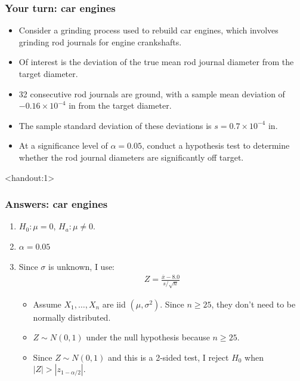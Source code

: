 \documentclass[handout]{beamer}\usepackage[]{graphicx}\usepackage[]{color}
\newcommand{\answers}{1}
\providecommand{\ov}[1]{\overline{#1}}
\numberwithin{equation}{section}
\begin{document}
\begin{frame}
\frametitle{Your turn: car engines}
\begin{itemize}
\item Consider a grinding process used to rebuild car engines, which involves grinding rod journals for engine crankshafts. 
\pause \item Of interest is the deviation of the true mean rod journal diameter from the target diameter.
\pause \item 32 consecutive rod journals are ground, with a sample mean deviation of $-0.16 \times 10^{-4}$ in from the target diameter.
\pause \item The sample standard deviation of these deviations is $s = 0.7 \times 10^{-4}$ in.
\pause \item At a significance level of $\alpha = 0.05$, conduct a hypothesis test to determine whether the rod journal diameters are significantly off target.
\end{itemize}
\end{frame}



\begin{frame}<handout:\answers>
\frametitle{Answers: car engines}
\begin{enumerate}[1. ]
\item  $H_0: \mu = 0$, $H_a: \mu \ne 0$. 
\pause \item $\alpha = 0.05$
\pause \item Since $\sigma$ is unknown, I use:
\begin{align*}
Z = \frac{\ov{x} - 8.0}{s/\sqrt{n}}
\end{align*}
\begin{itemize}
\pause \item Assume $X_1, \ldots, X_n$ are iid $(\mu, \sigma^2)$. Since $n \ge 25$, they don't need to be normally distributed.
\pause \item $Z \sim N(0,1)$ under the null hypothesis because $n \ge 25$.
\pause \item Since $Z \sim N(0,1)$ and this is a 2-sided test, I reject $H_0$ when $|Z| > |z_{1-\alpha/2}|$.
\end{itemize}
\end{enumerate}
\end{frame}
\end{document}
